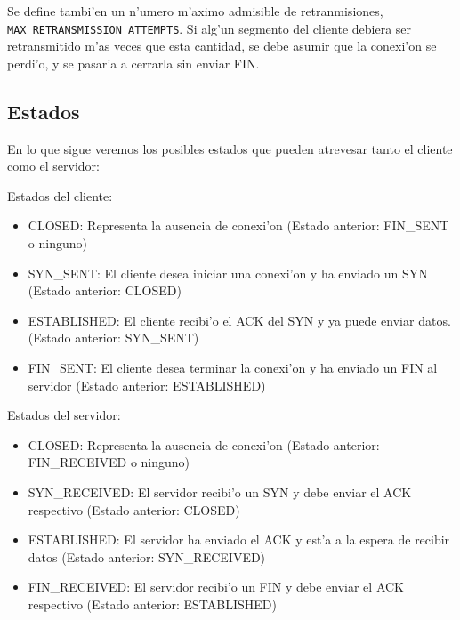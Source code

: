 Se define tambi'en un n'umero m'aximo admisible de retranmisiones, \texttt{MAX\_RETRANSMISSION\_ATTEMPTS}. Si alg'un segmento del cliente debiera ser retransmitido m'as veces que esta cantidad, se debe asumir que la conexi'on se perdi'o, y se pasar'a a cerrarla sin enviar FIN. 

\subsection{Estados}

En lo que sigue veremos los posibles estados que pueden atrevesar tanto el cliente como el servidor:

Estados del cliente:

\begin{itemize}
	\item CLOSED: Representa la ausencia de conexi'on (Estado anterior: FIN\_SENT o ninguno)
	\item SYN\_SENT: El cliente desea iniciar una conexi'on y ha enviado un SYN (Estado anterior: CLOSED)
	\item ESTABLISHED: El cliente recibi'o el ACK del SYN y ya puede enviar datos. (Estado anterior: SYN\_SENT)
	\item FIN\_SENT: El cliente desea terminar la conexi'on y ha enviado un FIN al servidor (Estado anterior: ESTABLISHED)
\end{itemize}

Estados del servidor: 

\begin{itemize}
	\item CLOSED: Representa la ausencia de conexi'on (Estado anterior: FIN\_RECEIVED o ninguno)
	\item SYN\_RECEIVED: El servidor recibi'o un SYN y debe enviar el ACK respectivo (Estado anterior: CLOSED)
	\item ESTABLISHED: El servidor ha enviado el ACK y est'a a la espera de recibir datos (Estado anterior: SYN\_RECEIVED)
	\item FIN\_RECEIVED: El servidor recibi'o un FIN y debe enviar el ACK respectivo (Estado anterior: ESTABLISHED)
\end{itemize}